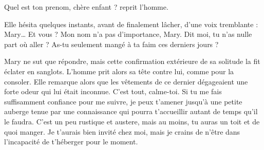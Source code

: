 \rep Quel est ton prenom, chère enfant ?
reprit l'homme.

Elle hésita quelques instants, avant de finalement lâcher, d'une voix tremblante :
\rep Mary\ldots{} Et vous ?
\rep Mon nom n'a pas d'importance, Mary.
Dit moi, tu n'as nulle part où aller ?
As-tu seulement mangé à ta faim ces derniers jours ?

Mary ne sut que répondre, mais cette confirmation extérieure de sa solitude la fit éclater en sanglots.
L'homme prit alors sa tête contre lui, comme pour la consoler.
Elle remarque alors que les vêtements de ce dernier dégageaient une forte odeur qui lui était inconnue.
\rep C'est tout, calme-toi.
Si tu me fais suffisamment confiance pour me suivre, je peux t'amener jusqu'à une petite auberge tenue par une connaissance qui pourra t'accueillir autant de temps qu'il le faudra.
C'est un peu rustique et austere, mais au moins, tu auras un toit et de quoi manger.
Je t'aurais bien invité chez moi, mais je crains de n'être dans l'incapacité de t'héberger pour le moment.


\fin
